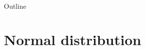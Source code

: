 \documentclass[slidestop,compress,mathserif]{beamer}
\begin{document}
%


%
%
%
%
%
%
%
%



\begin{frame}{Outline}
\tableofcontents[hideallsubsections]
\end{frame}
\section{Normal distribution}
\end{document}
